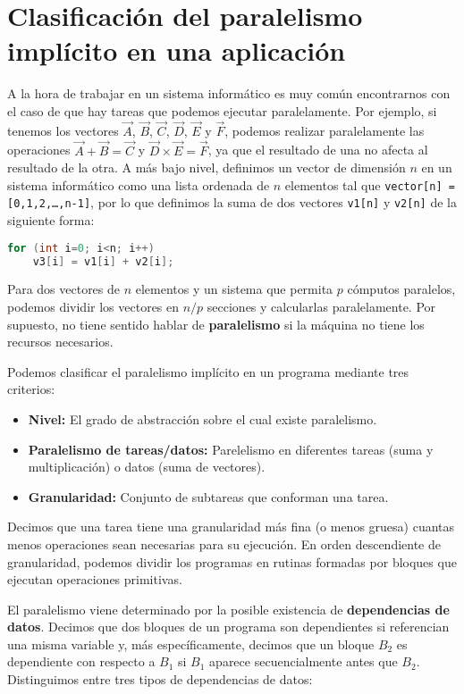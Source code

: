 \section{Clasificación del paralelismo implícito en una aplicación}

A la hora de trabajar en un sistema informático es muy común encontrarnos con el caso de que hay tareas que podemos ejecutar paralelamente.
Por ejemplo, si tenemos los vectores $\vec{A}$, $\vec{B}$, $\vec{C}$, $\vec{D}$, $\vec{E}$ y $\vec{F}$, podemos realizar paralelamente las operaciones $\vec{A}+\vec{B}=\vec{C}$ y $\vec{D}\times\vec{E}=\vec{F}$, ya que el resultado de una no afecta al resultado de la otra.
A más bajo nivel, definimos un vector de dimensión $n$ en un sistema informático como una lista ordenada de $n$ elementos tal que \texttt{vector[n] = [0,1,2,\ldots,n-1]}, por lo que definimos la suma de dos vectores \texttt{v1[n]} y \texttt{v2[n]} de la siguiente forma:

\begin{lstlisting}[language=C]
for (int i=0; i<n; i++)
	v3[i] = v1[i] + v2[i];
\end{lstlisting}

Para dos vectores de $n$ elementos y un sistema que permita $p$ cómputos paralelos, podemos dividir los vectores en $n/p$ secciones y calcularlas paralelamente.
Por supuesto, no tiene sentido hablar de \textbf{paralelismo} si la máquina no tiene los recursos necesarios.

Podemos clasificar el paralelismo implícito en un programa mediante tres criterios:

\begin{itemize}
	\item\textbf{Nivel:} El grado de abstracción sobre el cual existe paralelismo.
	\item\textbf{Paralelismo de tareas/datos:} Parelelismo en diferentes tareas (suma y multiplicación) o datos (suma de vectores).
	\item\textbf{Granularidad:} Conjunto de subtareas que conforman una tarea.
\end{itemize}

Decimos que una tarea tiene una granularidad más fina (o menos gruesa) cuantas menos operaciones sean necesarias para su ejecución.
En orden descendiente de granularidad, podemos dividir los programas en rutinas formadas por bloques que ejecutan operaciones primitivas.

El paralelismo viene determinado por la posible existencia de \textbf{dependencias de datos}.
Decimos que dos bloques de un programa son dependientes si referencian una misma variable y, más específicamente, decimos que un bloque $B_2$ es dependiente con respecto a $B_1$ si $B_1$ aparece secuencialmente antes que $B_2$.
Distinguimos entre tres tipos de dependencias de datos:

